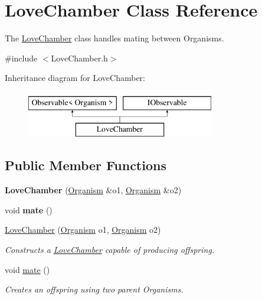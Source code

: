 \hypertarget{class_love_chamber}{}\section{Love\+Chamber Class Reference}
\label{class_love_chamber}


The \hyperlink{class_love_chamber}{Love\+Chamber} class handles mating between Organisms.  




{\ttfamily \#include $<$Love\+Chamber.\+h$>$}

Inheritance diagram for Love\+Chamber\+:\begin{figure}[H]
\begin{center}
\leavevmode
\includegraphics[height=2.000000cm]{class_love_chamber}
\end{center}
\end{figure}
\subsection*{Public Member Functions}
\begin{DoxyCompactItemize}
\item 
{\bfseries Love\+Chamber} (\hyperlink{class_organism}{Organism} \&o1, \hyperlink{class_organism}{Organism} \&o2)\hypertarget{class_love_chamber_a4f157ceb83d8b719de1ae69c6b88c555}{}\label{class_love_chamber_a4f157ceb83d8b719de1ae69c6b88c555}

\item 
void {\bfseries mate} ()\hypertarget{class_love_chamber_acdb1a279b4b6edfd8d38375c4faee182}{}\label{class_love_chamber_acdb1a279b4b6edfd8d38375c4faee182}

\item 
\hyperlink{class_love_chamber_afd8934456036b6252e0e968c26ffb04e}{Love\+Chamber} (\hyperlink{class_organism}{Organism} o1, \hyperlink{class_organism}{Organism} o2)
\begin{DoxyCompactList}\small\item\em Constructs a \hyperlink{class_love_chamber}{Love\+Chamber} capable of producing offspring. \end{DoxyCompactList}\item 
void \hyperlink{class_love_chamber_acdb1a279b4b6edfd8d38375c4faee182}{mate} ()
\begin{DoxyCompactList}\small\item\em Creates an offspring using two parent Organisms. \end{DoxyCompactList}\end{DoxyCompactItemize}
